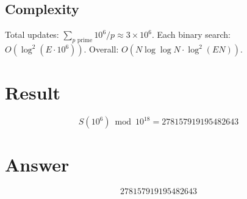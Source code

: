 \documentclass[12pt]{article}
\begin{document}
\subsection{Complexity}
Total updates: $\sum_{p\text{ prime}} 10^6/p \approx 3 \times 10^6$. Each binary search: $O(\log^2(E \cdot 10^6))$. Overall: $O(N \log\log N \cdot \log^2(EN))$.

\section{Result}
\[
S(10^6) \bmod 10^{18} = \boxed{278157919195482643}
\]

\section{Answer}

\[
\boxed{278157919195482643}
\]
\end{document}
